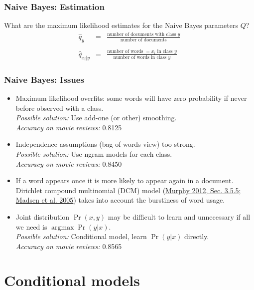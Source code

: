 \documentclass[ignorenonframetext,plain,fleqn]{beamer}
\DeclareMathOperator*{\argmax}{argmax}
\begin{document}
\begin{frame}\frametitle{Naive Bayes: Estimation}
What are the maximum likelihood estimates for the Naive Bayes
parameters $Q$?\begin{eqnarray*}
\hat{q}_y &=& \frac{\mbox{number of documents with class
    $y$}}{\mbox{number of documents}}\\
\\
\hat{q}_{x_i|y} &=& \frac{\mbox{number of words $=x_i$ in class
    $y$}}{\mbox{number of words in class $y$}}
\end{eqnarray*}  
\end{frame}

\begin{frame}\frametitle{Naive Bayes: Issues}
\begin{itemize}
\item Maximum likelihood overfits: some words will have zero
  probability if never before observed with a class.
  \\ \textsl{Possible solution:} Use add-one (or other) smoothing.
  \\ \textsl{Accuracy on movie reviews:} 0.8125
\item Independence assumptions (bag-of-words view) too strong.
  \\ \textsl{Possible solution:} Use ngram models for each class.
  \\ \textsl{Accuracy on movie reviews:} 0.8450 
\item If a word appears once it is more likely to appear again in a
  document.  Dirichlet compound multinomial (DCM) model
  (\href{http://www.cs.ubc.ca/~murphyk/MLbook} {Murphy 2012,
    Sec. 3.5.5};
  \href{http://eprints.pascal-network.org/archive/00001454/01/dcmnbV10.1.pdf}
       {Madsen et al. 2005}) takes into account the burstiness of word
       usage.
\item Joint distribution $\Pr(x,y)$ may be difficult to learn and
  unnecessary if all we need is $\argmax\Pr(y|x)$.
  \\ \textsl{Possible solution:} Conditional model, learn
  $\Pr(y|x)$ directly.
  \\ \textsl{Accuracy on movie reviews:} 0.8565
\end{itemize}
\end{frame}

\section{Conditional models}
\frame{\sectionpage}
\end{document}
